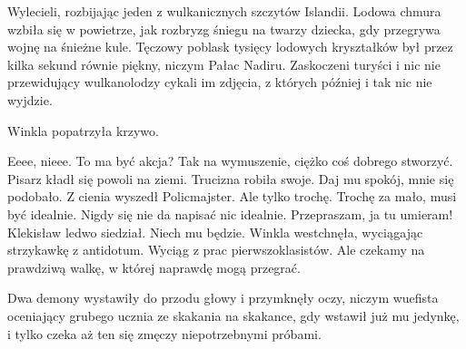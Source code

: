 Wylecieli, rozbijając jeden z wulkanicznych szczytów Islandii.
Lodowa chmura wzbiła się w powietrze, jak rozbryzg śniegu na twarzy dziecka, gdy przegrywa wojnę na śnieżne kule.
Tęczowy poblask tysięcy lodowych kryształków był przez kilka sekund równie piękny, niczym Pałac Nadiru.
Zaskoczeni turyści i nic nie przewidujący wulkanolodzy cykali im zdjęcia, z których później i tak nic nie wyjdzie.

\divider{}

Winkla popatrzyła krzywo.
\begin{dialogue}
\ds{} Eeee, nieee. To ma być akcja? 
\ds{} Tak na wymuszenie, ciężko coś dobrego stworzyć. \dm{} Pisarz kładł się powoli na ziemi. Trucizna robiła swoje.
\ds{} Daj mu spokój, mnie się podobało. \dm{} Z cienia wyszedł Policmajster. \dm{} Ale tylko trochę.
\ds{} Trochę za mało, musi być idealnie.
\ds{} Nigdy się nie da napisać nic idealnie.
\ds{} Przepraszam, ja tu umieram! \dm{} Klekisław ledwo siedział.
\ds{} Niech mu będzie. \dm{} Winkla westchnęła, wyciągając strzykawkę z antidotum. Wyciąg z prac pierwszoklasistów. \dm{} 
Ale czekamy na prawdziwą walkę, w której naprawdę mogą przegrać.
\end{dialogue}
Dwa demony wystawiły do przodu głowy i przymknęły oczy, niczym wuefista oceniający grubego ucznia ze skakania na skakance, 
gdy wstawił już mu jedynkę, i tylko czeka aż ten się zmęczy niepotrzebnymi próbami.

\divider{}


